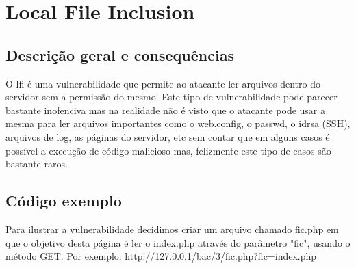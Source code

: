 \documentclass{report}
\begin{document}
\clearpage
\section{Local File Inclusion}

	\subsection{Descrição geral e consequências}

O \ac{lfi} é uma vulnerabilidade que permite ao atacante ler arquivos dentro do servidor sem a permissão do mesmo. Este tipo de vulnerabilidade pode parecer bastante inofenciva mas na realidade não é visto que o atacante pode usar a mesma para ler arquivos importantes como o web.config, o passwd, o id\textunderscore rsa (SSH), arquivos de log, as páginas do servidor, etc sem contar que em alguns casos é possível a execução de código malicioso mas, felizmente este tipo de casos são bastante raros.
\cite{neuralegionlfi}
\cite{lfitesting}
	\subsection{Código exemplo}

Para ilustrar a vulnerabilidade decidimos criar um arquivo chamado fic.php em que o objetivo desta página é ler o index.php através do parâmetro "fic", usando o método GET.
Por exemplo:
http://127.0.0.1/bac/3/fic.php?fic=index.php
\end{document}
